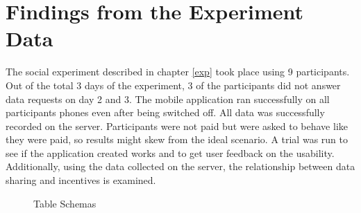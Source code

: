 \section{Findings from the Experiment Data}

The social experiment described in chapter \ref{exp} took place using 9 participants. Out of the total 3 days of the experiment, 3 of the participants did not answer data requests on day 2 and 3. The mobile application ran successfully on all participants phones even after being switched off. All data was successfully recorded on the server. Participants were not paid but were asked to behave like they were paid, so results might skew from the ideal scenario. A trial was run to see if the application created works and to get user feedback on the usability. Additionally, using the data collected on the server, the relationship between data sharing and incentives is examined. 

\begin{figure}[htp]
\hspace{1em}
\caption{Table Schemas}
\label{fig:st3}
\end{figure}

